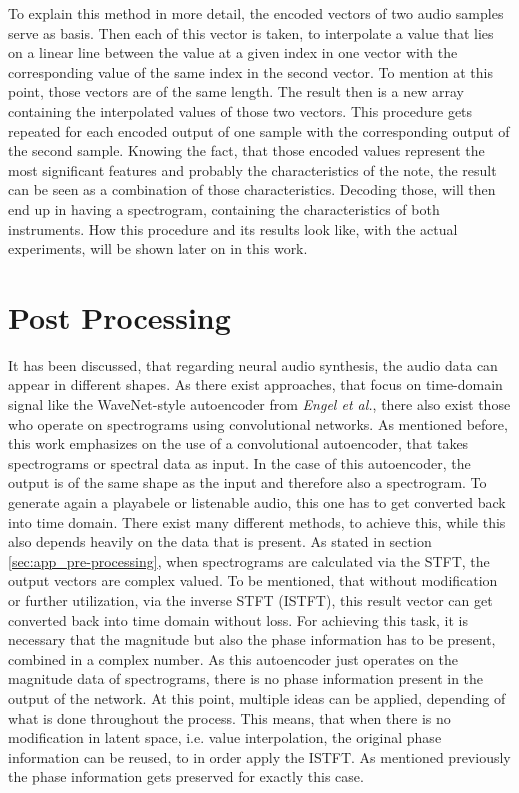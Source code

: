 To explain this method in more detail, the encoded vectors of two audio samples serve as basis. Then each of this vector is taken, to interpolate a value that lies on a linear line between the value at a given index in one vector with the corresponding value of the same index in the second vector. To mention at this point, those vectors are of the same length. The result then is a new array containing the interpolated values of those two vectors. This procedure gets repeated for each encoded output of one sample with the corresponding output of the second sample. Knowing the fact, that those encoded values represent the most significant features and probably the characteristics of the note, the result can be seen as a combination of those characteristics. Decoding those, will then end up in having a spectrogram, containing the characteristics of both instruments. How this procedure and its results look like, with the actual experiments, will be shown later on in this work. 

\section{Post Processing}
\label{sec:app_post_processing}
It has been discussed, that regarding neural audio synthesis, the audio data can appear in different shapes. As there exist approaches, that focus on time-domain signal like the WaveNet-style autoencoder from \textit{Engel et al.}, there also exist those who operate on spectrograms using convolutional networks. As mentioned before, this work emphasizes on the use of a convolutional autoencoder, that takes spectrograms or spectral data as input. In the case of this autoencoder, the output is of the same shape as the input and therefore also a spectrogram. To generate again a playabele or listenable audio, this one has to get converted back into time domain. There exist many different methods, to achieve this, while this also depends heavily on the data that is present. As stated in section \ref{sec:app_pre-processing}, when spectrograms are calculated via the STFT, the output vectors are complex valued. To be mentioned, that without modification or further utilization, via the inverse STFT (ISTFT), this result vector can get converted back into time domain without loss. For achieving this task, it is necessary that the magnitude but also the phase information has to be present, combined in a complex number. As this autoencoder just operates on the magnitude data of spectrograms, there is no phase information present in the output of the network. At this point, multiple ideas can be applied, depending of what is done throughout the process. This means, that when there is no modification in latent space, i.e. value interpolation, the original phase information can be reused, to in order apply the ISTFT. As mentioned previously the phase information gets preserved for exactly this case. 

